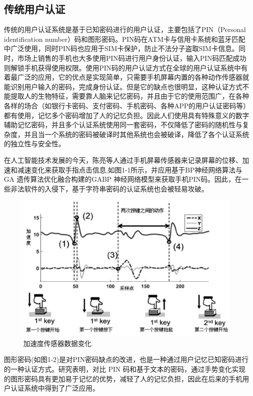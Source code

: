 \subsection{传统用户认证}
{传统的用户认证系统是基于已知密码进行的用户认证，主要包括了PIN（Personal identification number）码和图形密码。PIN码在ATM卡与信用卡系统和蓝牙匹配\cite{2009wang}中广泛使用，同时PIN码也应用于SIM卡保护，防止不法分子盗取SIM卡信息\cite{2020li}。同时，市场上销售的手机也大多使用PIN码进行用户身份认证，输入PIN码匹配成功则解锁手机获得使用权限\cite{2018chen}。使用PIN码的用户认证方式在全球的用户认证系统中有着最广泛的应用，它的优点是实现简单，只需要手机屏幕内置的各种动作传感器就能识别用户输入的密码，完成身份认证。但是它的缺点也很明显，这种认证方式不能提取人的生物特征，需要靠人脑来记忆密码，并且由于它的使用范围广，在各种各样的场合（如银行卡密码、支付密码、手机密码、各种APP的用户认证密码等）都有使用，记忆多个密码增加了人的记忆负担。因此人们使用具有特殊意义的数字辅助记忆密码，并且多个认证系统使用同一套密码，不仅降低了密码的随机性与复杂度，并且当一个系统的密码被破译时其他系统也会被破译，降低了各个认证系统的独立性与安全性。}
\par
{在人工智能技术发展的今天，陈亮等人通过手机屏幕传感器来记录屏幕的位移、加速和减速变化来获取手指点击信息,如图1-1所示，并应用基于BP神经网络算法与GA 遗传算法优化融合构建的GABP 神经网络模型来获取手机PIN码\cite{2018chen}。因此，在一些非法软件的入侵下，基于字符串密码的认证系统也会被轻易攻破。}
\begin{figure}[htbp]
  \centering
  \includegraphics[width=0.7\linewidth]{images/chen.png}
  \caption{加速度传感器数据变化\cite{2018chen}}\label{1-1} %
\end{figure}
\par
{图形密码(如图1-2)是对PIN密码缺点的改进，也是一种通过用户记忆已知密码进行的一种认证方式。研究表明，对比 PIN 码和基于文本的密码，通过手势变化实现的图形密码具有更加易于记忆的优势\cite{ 2008PassShapes}，减轻了人的记忆负担，因此在后来的手机用户认证系统中得到了广泛应用。}
